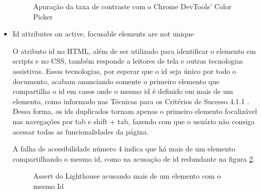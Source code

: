 \documentclass[
	12pt,				%
	openright,			%
	oneside,			%
	a4paper,			%
	chapter=TITLE,		%
	section=TITLE,		%
	subsection=TITLE,	%
	subsubsection=TITLE,%
	english,			%
	brazil				%
	]{abntex2}
\theoremstyle{definition}
\begin{document}
\begin{itemize}
\begin{figure}[!h]
\centering
\caption{Apuração da taxa de contraste com o Chrome DevTools’ Color Picker}
\label{Apuração da taxa de contraste com o Chrome DevTools’ Color Picker}
\end{figure}

\pagebreak

 \item Id attributes on active, focusable elements are not unique
   
O atributo id no HTML, além de ser utilizado para identificar o elemento em scripts e no CSS, também responde a leitores de tela e outras tecnologias assistivas. Essas tecnologias, por esperar que o id seja único por todo o documento, acabam anunciando somente o primeiro elemento que compartilha o id em casos onde o mesmo id é definido em mais de um elemento, como informado nas Técnicas para os Critérios de Sucesso 4.1.1 \cite{cooper2010techniques}. Dessa forma, os ids duplicados tornam apenas o primeiro elemento focalizável nas navegações por tab e shift + tab, fazendo com que o usuário não consiga acessar todas as funcionalidades da página.

A falha de acessibilidade número 4 indica que há mais de um elemento compartilhando o mesmo id, como na acusação de id redundante na figura \ref{Assert do Lighthouse acusando mais de um elemento com o mesmo Id}.

\begin{figure}[!h]
\centering
\caption{Assert do Lighthouse acusando mais de um elemento com o mesmo Id}
\label{Assert do Lighthouse acusando mais de um elemento com o mesmo Id}
\end{figure}


\end{itemize}
\end{document}
